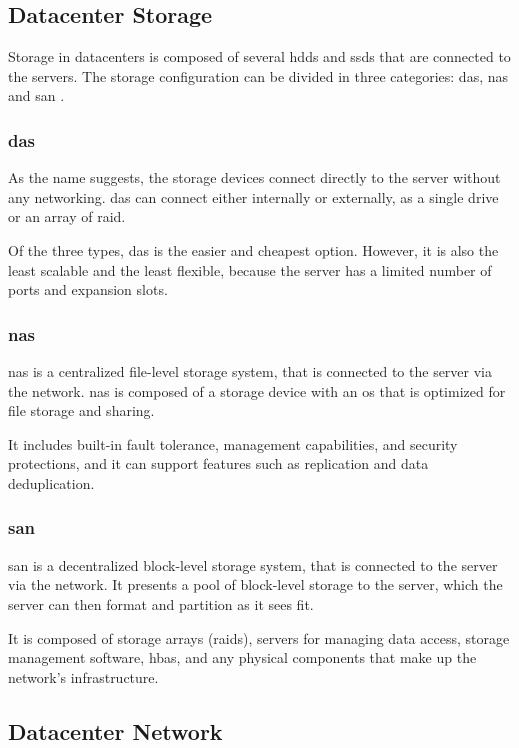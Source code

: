 \subsection{Datacenter Storage}

Storage in datacenters is composed of several \acp{hdd} and \acp{ssd} that are connected to the servers. The storage configuration can be divided in three categories: \ac{das}, \ac{nas} and \ac{san} \cite{Storage101}.

\subsubsection{\acl{das}}

As the name suggests, the storage devices connect directly to the server without any networking. \ac{das} can connect either internally or externally, as a single drive or an array of \ac{raid}. 

Of the three types, \ac{das} is the easier and cheapest option. However, it is also the least scalable and the least flexible, because the server has a limited number of ports and expansion slots.

\subsubsection{\acl{nas}}

\ac{nas} is a centralized file-level storage system, that is connected to the server via the network. \ac{nas} is composed of a storage device with an \ac{os} that is optimized for file storage and sharing.

It includes built-in fault tolerance, management capabilities, and security protections, and it can support features such as replication and data deduplication.

\subsubsection{\acl{san}}

\ac{san} is a decentralized block-level storage system, that is connected to the server via the network. It presents a pool of block-level storage to the server, which the server can then format and partition as it sees fit.

It is composed of storage arrays (\acp{raid}), servers for managing data access, storage management software, \acp{hba}, and any physical components that make up the network's infrastructure.

\subsection{Datacenter Network}

